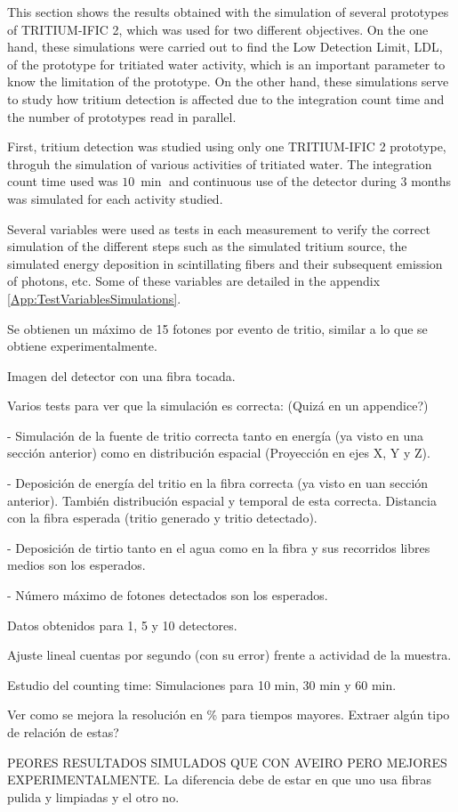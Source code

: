 This section shows the results obtained with the simulation of several prototypes of TRITIUM-IFIC 2, which was used for two different objectives. On the one hand, these simulations were carried out to find the Low Detection Limit, LDL, of the prototype for tritiated water activity, which is an important parameter to know the limitation of the prototype. On the other hand, these simulations serve to study how tritium detection is affected due to the integration count time and the number of prototypes read in parallel.

First, tritium detection was studied using only one TRITIUM-IFIC 2 prototype, throguh the simulation of various activities of tritiated water. The integration count time used was $10~\min$ and continuous use of the detector during 3 months was simulated for each activity studied.

Several variables were used as tests in each measurement to verify the correct simulation of the different steps such as the simulated tritium source, the simulated energy deposition in scintillating fibers and their subsequent emission of photons, etc. Some of these variables are detailed in the appendix \ref{App:TestVariablesSimulations}.



Se obtienen un máximo de 15 fotones por evento de tritio, similar a lo que se obtiene experimentalmente.

Imagen del detector con una fibra tocada.

Varios tests para ver que la simulación es correcta: (Quizá en un appendice?)

- Simulación de la fuente de tritio correcta tanto en energía (ya visto en una sección anterior) como en distribución espacial (Proyección en ejes X, Y y Z).

- Deposición de energía del tritio en la fibra correcta (ya visto en uan sección anterior). También distribución espacial y temporal de esta correcta. Distancia con la fibra esperada (tritio generado y tritio detectado).

- Deposición de tirtio tanto en el agua como en la fibra y sus recorridos libres medios son los esperados.

- Número máximo de fotones detectados son los esperados.

Datos obtenidos para 1, 5 y 10 detectores.

Ajuste lineal cuentas por segundo (con su error) frente a actividad de la muestra.

Estudio del counting time: Simulaciones para 10 min, 30 min y 60 min.

Ver como se mejora la resolución en \% para tiempos mayores. Extraer algún tipo de relación de estas?

PEORES RESULTADOS SIMULADOS QUE CON AVEIRO PERO MEJORES EXPERIMENTALMENTE. La diferencia debe de estar en que uno usa fibras pulida y limpiadas y el otro no.